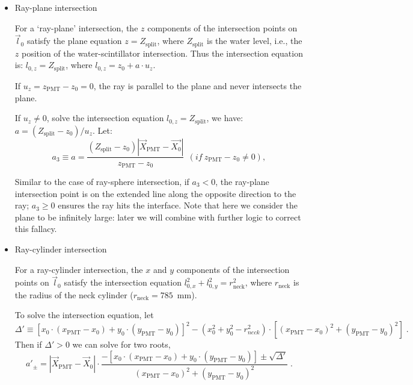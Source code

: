 \begin{itemize}
\item Ray-plane intersection

For a `ray-plane' intersection, the $z$ components of the intersection points on $\vec{l}_0$ satisfy the plane equation $z=Z_\mathrm{split}$, where $Z_\mathrm{split}$ is the water level, i.e., the $z$ position of the water-scintillator intersection. Thus the intersection equation is:
$l_{0,z}=Z_\mathrm{split}$, where $l_{0,z}=z_0+a\cdot u_z$.

If $u_z=z_\mathrm{PMT}-z_0=0$, the ray is parallel to the plane and never intersects the plane.

If $u_z\neq 0$, solve the intersection equation $l_{0,z}=Z_\mathrm{split}$, we have: $a=(Z_\mathrm{split}-z_0)/u_z$.
Let: 
\begin{equation}
a_3 \equiv a = \frac{(Z_\mathrm{split}-z_0)|\vec{X}_{\mathrm{PMT}}-\vec{X_0}|}{z_\mathrm{PMT}-z_0}~~(if ~z_\mathrm{PMT}-z_0\neq 0),
\end{equation}

Similar to the case of ray-sphere intersection, if $a_3<0$, the ray-plane intersection point is on the extended line along the opposite direction to the ray; $a_3 \geq 0$ ensures the ray hits the interface. Note that here we consider the plane to be infinitely large: later we will combine with further logic to correct this fallacy. 

\item Ray-cylinder intersection

For a ray-cylinder intersection, the $x$ and $y$ components of the intersection points on $\vec l_0$ satisfy the intersection equation $l^2_{0,x}+l^2_{0,y} = r^2_\mathrm{neck}$, where $r_\mathrm{neck}$ is the radius of the neck cylinder ($r_\mathrm{neck}=785$~mm).

To solve the intersection equation, let 
\begin{equation*}
\Delta'\equiv [x_0\cdot (x_\mathrm{PMT}-x_0)+y_0\cdot(y_\mathrm{PMT}-y_0)]^2 - ( x_0^2+y_0^2-r^2_{neck})\cdot [(x_\mathrm{PMT}-x_0)^2+(y_\mathrm{PMT}-y_0)^2] \; . 
\end{equation*}
Then if $\Delta'>0$ we can solve for two roots, 
\begin{equation}\label{eq:ray-cylinder}
a'_{\pm} = |\vec{X}_\mathrm{PMT}-\vec{X}_0|\cdot\frac{-[x_0\cdot (x_\mathrm{PMT}-x_0)+y_0\cdot(y_\mathrm{PMT}-y_0)] \pm \sqrt{\Delta'} }{(x_\mathrm{PMT}-x_0)^2+(y_\mathrm{PMT}-y_0)^2} \; .
\end{equation}


\end{itemize}
